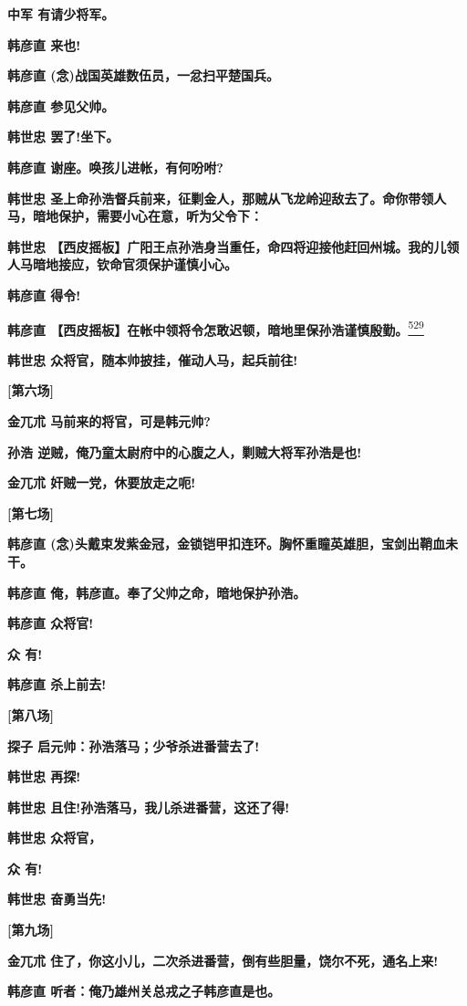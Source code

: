 \textbf{中军 有请少将军。}

\textbf{韩彦直 来也!}

\textbf{韩彦直 (念)战国英雄数伍员，一忿扫平楚国兵。}

\textbf{韩彦直 参见父帅。}

\textbf{韩世忠 罢了!坐下。}

\textbf{韩彦直 谢座。唤孩儿进帐，有何吩咐?}

\textbf{韩世忠
圣上命孙浩督兵前来，征剿金人，那贼从飞龙岭迎敌去了。命你带领人马，暗地保护，需要小心在意，听为父令下：}

\textbf{韩世忠
【西皮摇板】广阳王点孙浩身当重任，命四将迎接他赶回州城。我的儿领人马暗地接应，钦命官须保护谨慎小心。}

\textbf{韩彦直 得令!}

\textbf{韩彦直
【西皮摇板】在帐中领将令怎敢迟顿，暗地里保孙浩谨慎殷勤。}\protect\hyperlink{fn529}{\textsuperscript{529}}

\textbf{韩世忠 众将官，随本帅披挂，催动人马，起兵前往!}

\textbf{{[}第六场{]}}

\textbf{金兀朮 马前来的将官，可是韩元帅?}

\textbf{孙浩 逆贼，俺乃童太尉府中的心腹之人，剿贼大将军孙浩是也!}

\textbf{金兀朮 奸贼一党，休要放走之呃!}

\textbf{{[}第七场{]}}

\textbf{韩彦直
(念)头戴束发紫金冠，金锁铠甲扣连环。胸怀重瞳英雄胆，宝剑出鞘血未干。}

\textbf{韩彦直 俺，韩彦直。奉了父帅之命，暗地保护孙浩。}

\textbf{韩彦直 众将官!}

\textbf{众 有!}

\textbf{韩彦直 杀上前去!}

\textbf{{[}第八场{]}}

\textbf{探子 启元帅：孙浩落马；少爷杀进番营去了!}

\textbf{韩世忠 再探!}

\textbf{韩世忠 且住!孙浩落马，我儿杀进番营，这还了得!}

\textbf{韩世忠 众将官，}

\textbf{众 有!}

\textbf{韩世忠 奋勇当先!}

\textbf{{[}第九场{]}}

\textbf{金兀朮
住了，你这小儿，二次杀进番营，倒有些胆量，饶尔不死，通名上来!}

\textbf{韩彦直 听者：俺乃雄州关总戎之子韩彦直是也。}

